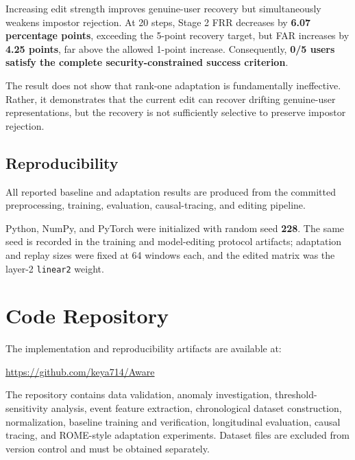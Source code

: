 \documentclass[conference]{IEEEtran}
\begin{document}
Increasing edit strength improves genuine-user recovery but simultaneously weakens impostor rejection. At 20 steps, Stage 2 FRR decreases by \textbf{6.07 percentage points}, exceeding the 5-point recovery target, but FAR increases by \textbf{4.25 points}, far above the allowed 1-point increase. Consequently, \textbf{0/5 users satisfy the complete security-constrained success criterion}.

The result does not show that rank-one adaptation is fundamentally ineffective. Rather, it demonstrates that the current edit can recover drifting genuine-user representations, but the recovery is not sufficiently selective to preserve impostor rejection.


\subsection{Reproducibility}

All reported baseline and adaptation results are produced from the committed preprocessing, training, evaluation, causal-tracing, and editing pipeline.

Python, NumPy, and PyTorch were initialized with random seed \textbf{228}. The same seed is recorded in the training and model-editing protocol artifacts; adaptation and replay sizes were fixed at 64 windows each, and the edited matrix was the layer-2 \texttt{linear2} weight.


\section*{Code Repository}

The implementation and reproducibility artifacts are available at:

\begin{center}
\url{https://github.com/keya714/Aware}
\end{center}

The repository contains data validation, anomaly investigation, threshold-sensitivity analysis, event feature extraction, chronological dataset construction, normalization, baseline training and verification, longitudinal evaluation, causal tracing, and ROME-style adaptation experiments. Dataset files are excluded from version control and must be obtained separately.


\end{document}
